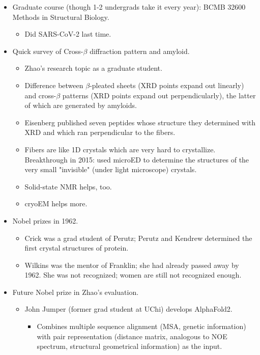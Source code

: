 \documentclass[../notes.tex]{subfiles}
\begin{document}
\begin{itemize}
\begin{table}[h!]
\begin{tabu}{c|c|[0.8pt]c|c|c|c|c}
        \end{tabu}
        \caption{Comparison of structural biology techniques.}
        \label{tab:structuralBiologyTechniques}
    \end{table}
    \item Graduate course (though 1-2 undergrads take it every year): BCMB 32600 Methods in Structural Biology.
    \begin{itemize}
        \item Did SARS-CoV-2 last time.
    \end{itemize}
    \item Quick survey of Cross-$\beta$ diffraction pattern and amyloid.
    \begin{itemize}
        \item Zhao's research topic as a graduate student.
        \item Difference between $\beta$-pleated sheets (XRD points expand out linearly) and cross-$\beta$ patterns (XRD points expand out perpendicularly), the latter of which are generated by amyloids.
        \item Eisenberg published seven peptides whose structure they determined with XRD and which ran perpendicular to the fibers.
        \item Fibers are like 1D crystals which are very hard to crystallize. Breakthrough in 2015: used microED to determine the structures of the very small "invisible" (under light microscope) crystals.
        \item Solid-state NMR helps, too.
        \item cryoEM helps more.
    \end{itemize}
    \item Nobel prizes in 1962.
    \begin{itemize}
        \item Crick was a grad student of Perutz; Perutz and Kendrew determined the first crystal structures of protein.
        \item Wilkins was the mentor of Franklin; she had already passed away by 1962. She was not recognized; women are still not recognized enough.
    \end{itemize}
    \item Future Nobel prize in Zhao's evaluation.
    \begin{itemize}
        \item John Jumper (former grad student at UChi) develops AlphaFold2.
        \begin{itemize}
            \item Combines multiple sequence alignment (MSA, genetic information) with pair representation (distance matrix, analogous to NOE spectrum, structural geometrical information) as the input.

\end{itemize}
\end{itemize}
\end{itemize}
\end{document}
